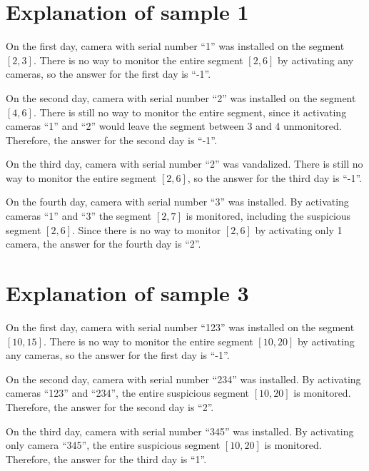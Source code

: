 \section*{Explanation of sample 1}
On the first day, camera with serial number ``1'' was installed on the segment $[2,3]$.
There is no way to monitor the entire segment $[2,6]$ by activating any cameras, so the answer for the first day is ``-1''.

On the second day, camera with serial number ``2'' was installed on the segment $[4,6]$.
There is still no way to monitor the entire segment, since it activating cameras ``1'' and ``2'' would leave the segment between 3 and 4 unmonitored.
Therefore, the answer for the second day is ``-1''.

On the third day, camera with serial number ``2'' was vandalized.
There is still no way to monitor the entire segment $[2,6]$, so the answer for the third day is ``-1''.

On the fourth day, camera with serial number ``3'' was installed.
By activating cameras ``1'' and ``3'' the segment $[2,7]$ is monitored, including the suspicious segment $[2,6]$.
Since there is no way to monitor $[2,6]$ by activating only 1 camera, the answer for the fourth day is ``2''.


\section*{Explanation of sample 3}
On the first day, camera with serial number ``123'' was installed on the segment $[10,15]$.
There is no way to monitor the entire segment $[10,20]$ by activating any cameras, so the answer for the first day is ``-1''.

On the second day, camera with serial number ``234'' was installed.
By activating cameras ``123'' and ``234'', the entire suspicious segment $[10,20]$ is monitored.
Therefore, the answer for the second day is ``2''.

On the third day, camera with serial number ``345'' was installed.
By activating only camera ``345'', the entire suspicious segment $[10,20]$ is monitored.
Therefore, the answer for the third day is ``1''.
